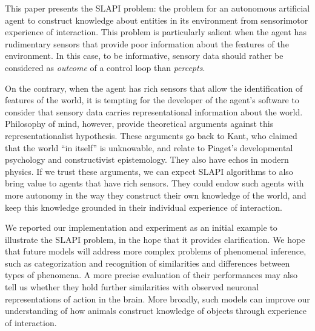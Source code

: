 \documentclass[pmlr]{jmlr}%
\begin{document}
This paper presents the SLAPI problem: the problem for an autonomous artificial agent to construct knowledge about entities in its environment from sensorimotor experience of interaction.  
This problem is particularly salient when the agent has rudimentary sensors that provide poor information about the features of the environment. 
In this case, to be informative, sensory data should rather be considered as \textit{outcome} of a control loop than \textit{percepts}.

On the contrary, when the agent has rich sensors that allow the identification of features of the world, it is tempting for the developer of the agent's software to consider that sensory data carries representational information about the world. 
Philosophy of mind, however, provide theoretical arguments against this representationalist hypothesis. 
These arguments go back to Kant, who claimed that the world ``in itself'' is unknowable, and relate to Piaget's developmental psychology and constructivist epistemology. 
They also have echos in modern physics. 
If we trust these arguments, we can expect SLAPI algorithms to also bring value to agents that have rich sensors. 
They could endow such agents with more autonomy in the way they construct their own knowledge of the world, and keep this knowledge grounded in their individual experience of interaction.

We reported our implementation and experiment as an initial example to illustrate the SLAPI problem, in the hope that it provides clarification. 
We hope that future models will address more complex problems of phenomenal inference, such as categorization and recognition of similarities and differences between types of phenomena. 
A more precise evaluation of their performances may also tell us whether they hold further similarities with observed neuronal representations of action in the brain. 
More broadly, such models can improve our understanding of how animals construct knowledge of objects through experience of interaction. 


\end{document}
